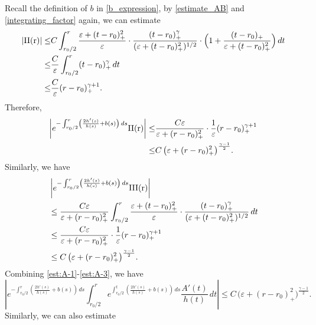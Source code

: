 \documentclass[reqno, 10pt]{amsart}
\theoremstyle{plain}
\theoremstyle{definition}
\theoremstyle{remark}
\numberwithin{equation}{section}
\begin{document}
Recall the definition of $b$ in \eqref{b_expression}, by \eqref{estimate_AB} and \eqref{integrating_factor} again, we can estimate
\begin{align*}
    |\rm{II}(r)| \le & C \int_{r_0/2}^r \frac{\varepsilon + (t - r_0)_+^2}{\varepsilon}\cdot \frac{(t-r_0)_+^\gamma}{(\varepsilon + (t-r_0)_+^2)^{1/2}} \cdot \Big( 1 +  \frac{(t-r_0)_+}{\varepsilon + (t-r_0)_+^2} \Big) \, dt\\
    \le & \frac{C}{\varepsilon} \int_{r_0/2}^r (t-r_0)_+^\gamma \, dt\\
    \le & \frac{C}{\varepsilon} (r-r_0)_+^{\gamma+1}.
\end{align*}
Therefore,
\begin{equation}\label{est:A-2}
\begin{aligned}
    \left| e^{-\int_{r_0/2}^r \left(\frac{2h'(s)}{h(s)} + b(s)\right) \, ds} \rm{II}(r) \right| \le & \frac{C\varepsilon}{\varepsilon + (r - r_0)_+^2} \cdot \frac{1}{\varepsilon} (r-r_0)_+^{\gamma+1}\\
    \le & C\,\big(\varepsilon + (r-r_0)_+^2\big)^{\frac{\gamma-1}{2}}.
\end{aligned}
\end{equation}
Similarly, we have
\begin{equation}\label{est:A-3}
\begin{aligned}
     & \left| e^{-\int_{r_0/2}^r \left(\frac{2h'(s)}{h(s)} + b(s)\right) \, ds} \rm{III}(r) \right|\\
     &\le  \frac{C\varepsilon}{\varepsilon + (r - r_0)_+^2} \int_{r_0/2}^r \frac{\varepsilon + (t - r_0)_+^2}{\varepsilon}\cdot \frac{(t-r_0)_+^\gamma}{(\varepsilon + (t-r_0)_+^2)^{1/2}} \, dt\\
     &\le  \frac{C\varepsilon}{\varepsilon + (r - r_0)_+^2} \cdot \frac{1}{\varepsilon} (r-r_0)_+^{\gamma+1}\\
     &\le  C\,\big(\varepsilon + (r-r_0)_+^2\big)^{\frac{\gamma-1}{2}}.
\end{aligned}
\end{equation}
Combining \eqref{est:A-1}-\eqref{est:A-3}, we have
\begin{equation}\label{est:A}
\left| e^{-\int_{r_0/2}^r \left(\frac{2h'(s)}{h(s)} + b(s)\right) \, ds} \int_{r_0/2}^r  e^{\int_{r_0/2}^t \left(\frac{2h'(s)}{h(s)} + b(s)\right) \, ds} \frac{A'(t)}{h(t)} \, dt \right| \le C\,\big(\varepsilon + (r-r_0)_+^2\big)^{\frac{\gamma-1}{2}}.
\end{equation}
Similarly, we can also estimate
\end{document}
